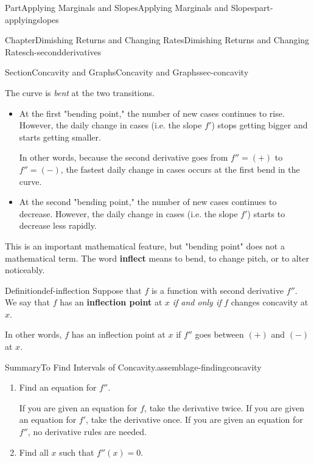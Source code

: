 \documentclass[oneside,10pt,]{tufte-book}
\newcommand{\terminology}[1]{\textbf{#1}}
\numberwithin{equation}{chapter}
\def\drawtikzspline(#1,#2,#3,#4,#5,#6){ \draw[curve,domain=(#1):(#4)] plot (\x , { ( (((#3) + (#6))*(#1) - ((#3) + (#6))*(#4) - 2*(#2) + 2*(#5))/((#1)^3 - 3*((#1)^2)*(#4) + 3*(#1)*((#4)^2) - (#4)^3) )*((\x)^3) + ( -(((#3) + 2*(#6))*((#1)^2) + ((#3) - (#6))*(#1)*(#4) - (2*(#3) + (#6))*((#4)^2) - 3*((#1) + (#4))*(#2) + 3*((#1) + (#4))*(#5))/((#1)^3 - 3*((#1)^2)*(#4) + 3*(#1)*((#4)^2) - (#4)^3) ) *((\x)^2) + ( ((#6)*((#1)^3) + (2*(#3) + (#6))*((#1)^2)*(#4) - ((#3) + 2*(#6))*(#1)*((#4)^2) - (#3)*((#4)^3) - 6*(#1)*(#4)*(#2) + 6*(#1)*(#4)*(#5))/((#1)^3 - 3*((#1)^2)*(#4) + 3*(#1)*((#4)^2) - (#4)^3) ) * (\x) + ( -((#6)*((#1)^3)*(#4) + ((#3) - (#6))*((#1)^2)*(#4)^2 - (#3)*(#1)*((#4)^3) - (3*(#1)*((#4)^2) - (#4)^3)*(#2) - ((#1)^3 - 3*((#1)^2)*(#4))*(#5))/((#1)^3 - 3*((#1)^2)*(#4) + 3*(#1)*((#4)^2) - (#4)^3))}) }
\begin{document}
\begin{partptx}{Part}{Applying Marginals and Slopes}{}{Applying Marginals and Slopes}{}{}{part-applyingslopes}
\begin{chapterptx}{Chapter}{Dimishing Returns and Changing Rates}{}{Dimishing Returns and Changing Rates}{}{}{ch-secondderivatives}
\begin{sectionptx}{Section}{Concavity and Graphs}{}{Concavity and Graphs}{}{}{sec-concavity}
\begin{image}{0.35}{0.3}{0.35}{}
{
}%
\end{image}%
 The curve is \emph{bent} at the two transitions.%
\begin{itemize}[label=\textbullet]
\item{}At the first "bending point," the number of new cases continues to rise. However, the daily change in cases (i.e. the slope \(f'\)) stops getting bigger and starts getting smaller.%
\par
In other words, because the second derivative  goes from \(f''=(+)\) to \(f''=(-)\), the fastest daily change in cases occurs at the first bend in the curve.%
\item{}At the second "bending point," the number of new cases continues to decrease. However, the daily change in cases (i.e. the slope \(f'\)) starts to decrease less rapidly.%
\end{itemize}
This is an important mathematical feature, but "bending point" does not a mathematical term.  The word \terminology{inflect} means to bend, to change pitch, or to alter noticeably.%
\begin{definition}{Definition}{}{def-inflection}%
Suppose that \(f\) is a function with second derivative \(f''\). We say that \(f\) has an \terminology{inflection point} at \(x\) \emph{if and only if} \(f\) changes concavity at \(x\).%
\par
In other words, \(f\) has an inflection point at \(x\) if \(f''\) goes between \((+)\) and \((-)\) at \(x\).%
\end{definition}
\begin{assemblage}{Summary}{To Find Intervals of Concavity.}{assemblage-findingconcavity}%
%
\begin{enumerate}
\item{}Find an equation for \(f''\).%
\par
If you are given an equation for \(f\), take the derivative twice. If you are given an equation for \(f'\), take the derivative once. If you are given an equation for \(f''\), no derivative rules are needed.%
\item{}Find all \(x\) such that \(f''(x)=0\).%

\end{enumerate}
\end{assemblage}
\end{sectionptx}
\end{chapterptx}
\end{partptx}
\end{document}
